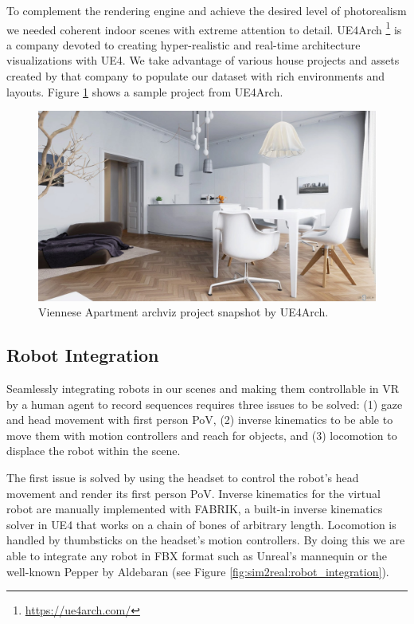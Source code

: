 To complement the rendering engine and achieve the desired level of photorealism we needed coherent indoor scenes with extreme attention to detail. UE4Arch \footnote{\url{https://ue4arch.com/}} is a company devoted to creating hyper-realistic and real-time architecture visualizations with \ac{UE4}. We take advantage of various house projects and assets created by that company to populate our dataset with rich environments and layouts. Figure \ref{fig:sim2real:ue4arch} shows a sample project from UE4Arch.

\begin{figure}[!th]
  \centering
  \includegraphics[width=\linewidth]{Figures/Sim2Real/ue4arch.jpg}
  \caption{Viennese Apartment archviz project snapshot by UE4Arch.}
  \label{fig:sim2real:ue4arch}
\end{figure}

\subsection{Robot Integration}

Seamlessly integrating robots in our scenes and making them controllable in \ac{VR} by a human agent to record sequences requires three issues to be solved: (1) gaze and head movement with first person \ac{PoV}, (2) inverse kinematics to be able to move them with motion controllers and reach for objects, and (3) locomotion to displace the robot within the scene.

The first issue is solved by using the headset to control the robot's head movement and render its first person \ac{PoV}. Inverse kinematics for the virtual robot are manually implemented with \ac{FABRIK}, a built-in inverse kinematics solver in \ac{UE4} that works on a chain of bones of arbitrary length. Locomotion is handled by thumbsticks on the headset's motion controllers. By doing this we are able to integrate any robot in FBX format such as Unreal's mannequin or the well-known Pepper by Aldebaran (see Figure \ref{fig:sim2real:robot_integration}).

